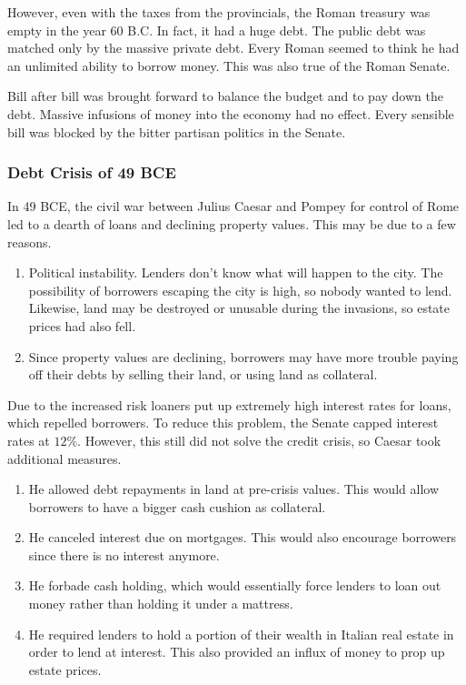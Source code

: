 \documentclass{article}
\begin{document}
      However, even with the taxes from the provincials, the Roman treasury was empty in the year 60 B.C. In fact, it had a huge debt. The public debt was matched only by the massive private debt. Every Roman seemed to think he had an unlimited ability to borrow money. This was also true of the Roman Senate.

      Bill after bill was brought forward to balance the budget and to pay down the debt. Massive infusions of money into the economy had no effect. Every sensible bill was blocked by the bitter partisan politics in the Senate.

    \subsubsection{Debt Crisis of 49 BCE}

      In 49 BCE, the civil war between Julius Caesar and Pompey for control of Rome led to a dearth of loans and declining property values. This may be due to a few reasons. 
      \begin{enumerate}
        \item Political instability. Lenders don't know what will happen to the city. The possibility of borrowers escaping the city is high, so nobody wanted to lend. Likewise, land may be destroyed or unusable during the invasions, so estate prices had also fell. 

        \item Since property values are declining, borrowers may have more trouble paying off their debts by selling their land, or using land as collateral.  
      \end{enumerate}

      Due to the increased risk loaners put up extremely high interest rates for loans, which repelled borrowers. To reduce this problem, the Senate capped interest rates at $12\%$. However, this still did not solve the credit crisis, so Caesar took additional measures. 
      \begin{enumerate}
        \item He allowed debt repayments in land at pre-crisis values. This would allow borrowers to have a bigger cash cushion as collateral. 
        \item He canceled interest due on mortgages. This would also encourage borrowers since there is no interest anymore. 
        \item He forbade cash holding, which would essentially force lenders to loan out money rather than holding it under a mattress. 
        \item He required lenders to hold a portion of their wealth in Italian real estate in order to lend at interest. This also provided an influx of money to prop up estate prices.  
      \end{enumerate}
\end{document}
